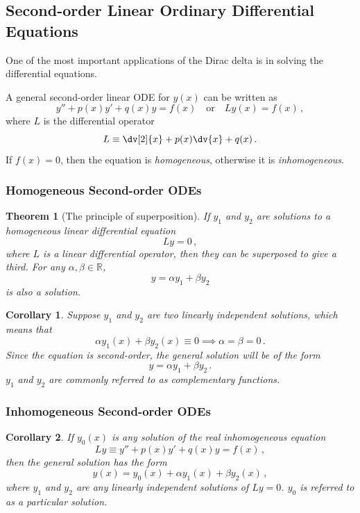 \documentclass{article}
\theoremstyle{plain}\theoremheaderfont{\normalfont\itshape}\theorembodyfont{\rmfamily}\theoremseparator{.}\newtheorem*{rem}{Remark}\newtheorem*{ex}{Example}\newtheorem*{proof}{Proof}\newtheorem*{altp}{Alternative proof}
\theoremstyle{plain}\theoremheaderfont{\normalfont\bfseries}\theorembodyfont{\rmfamily}\theoremseparator{.}\newtheorem{thm}{Theorem}[section]\newtheorem{lem}[thm]{Lemma}\newtheorem{prop}[thm]{Proposition}\newtheorem*{cor}{Corollary}\newtheorem{defn}[thm]{Definition}\newtheorem{clm}[thm]{Claim}\newtheorem{clminproof}{Claim}
\theoremstyle{break}\theoremheaderfont{\normalfont\itshape}\theorembodyfont{\rmfamily}\theoremseparator{.\medskip}\newtheorem*{proofskip}{Proof}\newtheorem*{exs}{Examples}\newtheorem*{rems}{Remarks}
\theoremstyle{break}\theoremheaderfont{\normalfont\bfseries}\theorembodyfont{\rmfamily}\theoremseparator{.\medskip}\newtheorem{lemskip}[thm]{Lemma}\newtheorem{defnskip}[thm]{Definition}\newtheorem{propskip}[thm]{Proposition}\newtheorem{thmskip}[thm]{Theorem}
\numberwithin{equation}{section}
\begin{document}
	\subsection{Second-order Linear Ordinary Differential Equations}
	One of the most important applications of the Dirac delta is in solving the differential equations. 

	A general second-order linear ODE for \(y(x)\) can be written as
	\[y''+p(x)y'+q(x)y=f(x)\quad \text{or}\quad Ly(x)=f(x)\,,\]
	where \(L\) is the differential operator
	\[L\equiv\dv[2]{x}+p(x)\dv{x}+q(x)\,.\]
	If \(f(x)=0\), then the equation is \textit{homogeneous}, otherwise it is \textit{inhomogeneous}.

	\subsubsection{Homogeneous Second-order ODEs}

	\begin{thm}[The principle of superposition]
		If \(y_1\) and \(y_2\) are solutions to a homogeneous linear differential equation
		\[Ly=0\,,\]
		where \(L\) is a linear differential operator, then they can be superposed to give a third. For any \(\alpha,\beta\in\mathbb{R}\),
		\[y=\alpha y_1+\beta y_2\]
		is also a solution.
	\end{thm}
	
	\begin{cor}
		Suppose \(y_1\) and \(y_2\) are two linearly independent solutions, which means that
		\[\alpha y_1(x)+\beta y_2(x)\equiv 0\implies\alpha=\beta=0\,.\]
		Since the equation is second-order, the general solution will be of the form
		\[y=\alpha y_1+\beta y_2\,.\]
		\(y_1\) and \(y_2\) are commonly referred to as \textit{complementary functions}.
	\end{cor}
	\subsubsection{Inhomogeneous Second-order ODEs}
	\begin{cor}
		If \(y_0(x)\) is any solution of the real inhomogeneous equation
		\[Ly\equiv y''+p(x)y'+q(x)y=f(x)\,,\]
		then the general solution has the form
		\[y(x)=y_0(x)+\alpha y_1(x)+\beta y_2(x)\,,\]
		where \(y_1\) and \(y_2\) are any linearly independent solutions of \(Ly=0\). \(y_0\) is referred to as a \textit{particular solution}.
	\end{cor}
\end{document}
